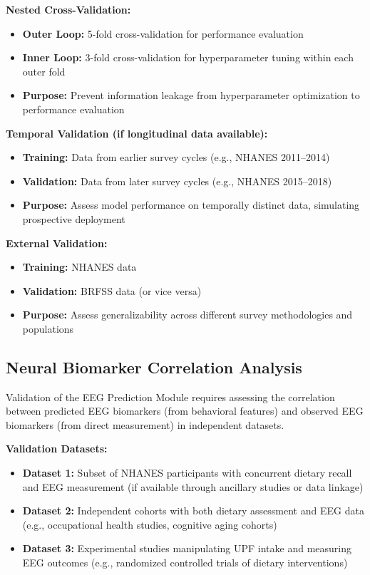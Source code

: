 \documentclass[journal,twoside,10pt]{IEEEtran}
\begin{document}
\textbf{Nested Cross-Validation:}
\begin{itemize}
\item \textbf{Outer Loop:} 5-fold cross-validation for performance evaluation
\item \textbf{Inner Loop:} 3-fold cross-validation for hyperparameter tuning within each outer fold
\item \textbf{Purpose:} Prevent information leakage from hyperparameter optimization to performance evaluation
\end{itemize}

\textbf{Temporal Validation (if longitudinal data available):}
\begin{itemize}
\item \textbf{Training:} Data from earlier survey cycles (e.g., NHANES 2011--2014)
\item \textbf{Validation:} Data from later survey cycles (e.g., NHANES 2015--2018)
\item \textbf{Purpose:} Assess model performance on temporally distinct data, simulating prospective deployment
\end{itemize}

\textbf{External Validation:}
\begin{itemize}
\item \textbf{Training:} NHANES data
\item \textbf{Validation:} BRFSS data (or vice versa)
\item \textbf{Purpose:} Assess generalizability across different survey methodologies and populations
\end{itemize}

\subsection{Neural Biomarker Correlation Analysis}

Validation of the EEG Prediction Module requires assessing the correlation between predicted EEG biomarkers (from behavioral features) and observed EEG biomarkers (from direct measurement) in independent datasets.

\textbf{Validation Datasets:}
\begin{itemize}
\item \textbf{Dataset 1:} Subset of NHANES participants with concurrent dietary recall and EEG measurement (if available through ancillary studies or data linkage)
\item \textbf{Dataset 2:} Independent cohorts with both dietary assessment and EEG data (e.g., occupational health studies, cognitive aging cohorts)
\item \textbf{Dataset 3:} Experimental studies manipulating UPF intake and measuring EEG outcomes (e.g., randomized controlled trials of dietary interventions)
\end{itemize}
\end{document}
